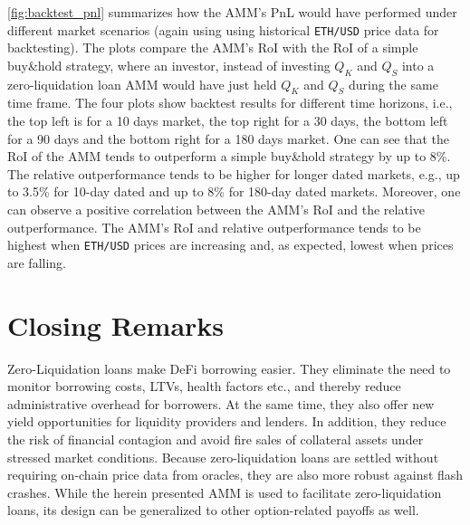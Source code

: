 \documentclass[a4paper]{article}
\begin{document}
\cref{fig:backtest_pnl} summarizes how the AMM's PnL would have performed under different market scenarios (again using using historical \verb|ETH/USD| price data for backtesting). The plots compare the AMM's RoI with the RoI of a simple buy\&hold strategy, where an investor, instead of investing $Q_K$ and $Q_S$ into a zero-liquidation loan AMM would have just held $Q_K$ and $Q_S$ during the same time frame. The four plots show backtest results for different time horizons, i.e., the top left is for a 10 days market, the top right for a 30 days, the bottom left for a 90 days and the bottom right for a 180 days market. One can see that the RoI of the AMM tends to outperform a simple buy\&hold strategy by up to 8\%. The relative outperformance tends to be higher for longer dated markets, e.g., up to 3.5\% for 10-day dated and up to 8\% for 180-day dated markets. Moreover, one can observe a positive correlation between the AMM's RoI and the relative outperformance. The AMM's RoI and relative outperformance tends to be highest when \verb|ETH/USD| prices are increasing and, as expected, lowest when prices are falling.

\section{Closing Remarks}
Zero-Liquidation loans make DeFi borrowing easier. They eliminate the need to monitor borrowing costs, LTVs, health factors etc., and thereby reduce administrative overhead for borrowers. At the same time, they also offer new yield opportunities for liquidity providers and lenders. In addition, they reduce the risk of financial contagion and avoid fire sales of collateral assets under stressed market conditions. Because zero-liquidation loans are settled without requiring on-chain price data from oracles, they are also more robust against flash crashes. While the herein presented AMM is used to facilitate zero-liquidation loans, its design can be generalized to other option-related payoffs as well. %

\newpage


\end{document}
